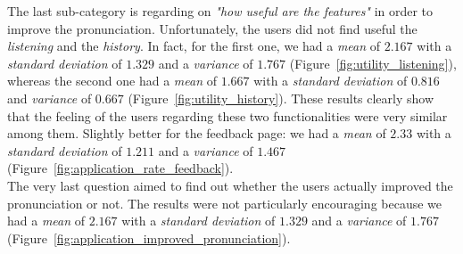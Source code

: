 \noindent The last sub-category is regarding on \textit{"how useful are the features"} in order to improve the pronunciation. Unfortunately, the users did not find useful the \textit{listening} and the \textit{history}. In fact, for the first one, we had a \textit{mean} of $2.167$ with a \textit{standard deviation} of $1.329$ and a \textit{variance} of $1.767$ (Figure~\ref{fig:utility_listening}), whereas the second one had a \textit{mean} of $1.667$ with a \textit{standard deviation} of $0.816$ and \textit{variance} of $0.667$ (Figure~\ref{fig:utility_history}). These results clearly show that the feeling of the users regarding these two functionalities were very similar among them. Slightly better for the feedback page: we had a \textit{mean} of $2.33$ with a \textit{standard deviation} of $1.211$ and a \textit{variance} of $1.467$ (Figure~\ref{fig:application_rate_feedback}). \\
\noindent The very last question aimed to find out whether the users actually improved the pronunciation or not. The results were not particularly encouraging because we had a \textit{mean} of $2.167$ with a \textit{standard deviation} of $1.329$ and a \textit{variance} of $1.767$ (Figure~\ref{fig:application_improved_pronunciation}).

